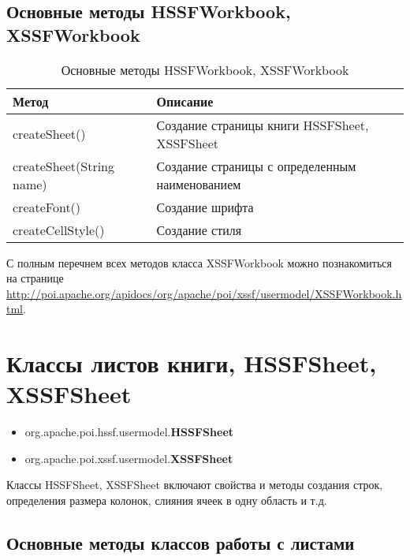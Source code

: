 \subsection{Основные методы HSSFWorkbook, XSSFWorkbook}

\begin{table}[h!]
	\begin{center}
		\caption{Основные методы HSSFWorkbook, XSSFWorkbook}
		\label{tab:listOfComponentsWithBooks}
		\begin{tabular}{l|l}
			\textbf{Метод} & \textbf{Описание} \\
			\hline
			createSheet() & Создание страницы книги HSSFSheet, XSSFSheet \\
			createSheet(String name) & Создание страницы с определенным наименованием \\
			createFont()  & Создание шрифта \\ 
			createCellStyle() & Создание стиля \\
		\end{tabular}
	\end{center}
\end{table}

С полным перечнем всех методов класса XSSFWorkbook можно познакомиться на странице \href{http://poi.apache.org/apidocs/org/apache/poi/xssf/usermodel/XSSFWorkbook.html}{http://poi.apache.org/apidocs/org/apache/poi/xssf/usermodel/XSSFWorkbook.html}.

\section{Классы листов книги, HSSFSheet, XSSFSheet}

\begin{itemize}
	\item org.apache.poi.hssf.usermodel.\textbf{HSSFSheet}
	\item org.apache.poi.xssf.usermodel.\textbf{XSSFSheet}
\end{itemize}

Классы HSSFSheet, XSSFSheet включают свойства и методы создания строк, определения размера колонок, слияния ячеек в одну область и т.д.

\subsection{Основные методы классов работы с листами}

